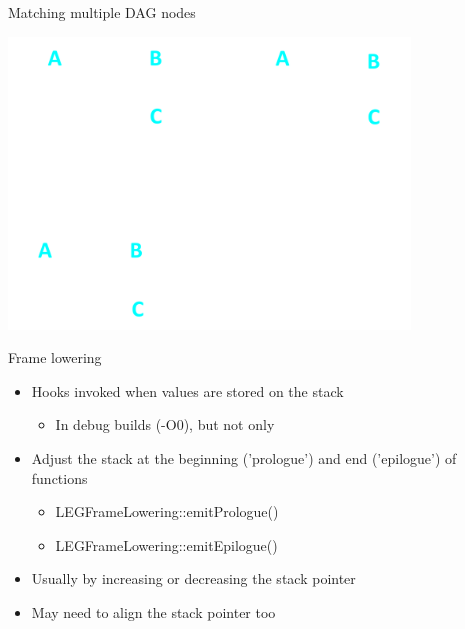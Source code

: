 
\begin{frame}[fragile]{Matching multiple DAG nodes}

\includegraphics[width = 0.80\textwidth]{examples/ex3/ex3-selection1.png}

\end{frame}


\begin{frame}{Frame lowering}

\begin{itemize}
    \item Hooks invoked when values are stored on the stack
    \begin{itemize}
        \item In debug builds (-O0), but not only
    \end{itemize}
    \item Adjust the stack at the beginning ('prologue') and end ('epilogue') of functions
    \begin{itemize}
        \item LEGFrameLowering::emitPrologue()
        \item LEGFrameLowering::emitEpilogue()
    \end{itemize}
    \item Usually by increasing or decreasing the stack pointer
    \item May need to align the stack pointer too
\end{itemize}

\end{frame}

